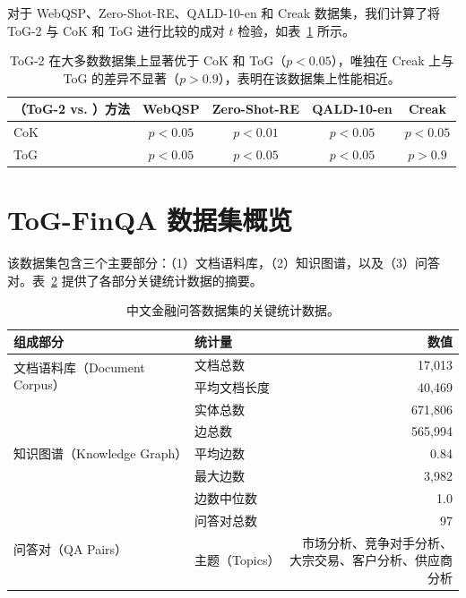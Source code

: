 \documentclass[11pt,UTF8,fontset=fandol]{ctexart}
\newcommand{\toctwo}{ToG-2}
\begin{document}
对于 WebQSP、Zero-Shot-RE、QALD-10-en 和 Creak 数据集，我们计算了将 \toctwo{} 与 CoK 和 ToG 进行比较的成对 $t$ 检验，如表~\ref{tab:12} 所示。

\begin{table}[H]\centering
\caption{\toctwo{} 在大多数数据集上显著优于 CoK 和 ToG（$p<0.05$），唯独在 Creak 上与 ToG 的差异不显著（$p>0.9$），表明在该数据集上性能相近。}
\begin{tabular}{lcccc}
\toprule
（\toctwo{} vs. ）方法 & WebQSP & Zero-Shot-RE & QALD-10-en & Creak\\
\midrule
CoK & $p<0.05$ & $p<0.01$ & $p<0.05$ & $p<0.05$\\
ToG & $p<0.05$ & $p<0.05$ & $p<0.05$ & $p>0.9$\\
\bottomrule
\end{tabular}
\label{tab:12}
\end{table}

\section{ToG-FinQA 数据集概览}

该数据集包含三个主要部分：（1）文档语料库，（2）知识图谱，以及（3）问答对。表~\ref{tab:13} 提供了各部分关键统计数据的摘要。

\begin{table}[H]\centering
\caption{中文金融问答数据集的关键统计数据。}
\setlength{\tabcolsep}{6pt}
\renewcommand{\arraystretch}{1.2}
\small
\begin{tabular}{llr}
\toprule
组成部分 & 统计量 & 数值\\
\midrule
\multirow{2}{*}{文档语料库（Document Corpus）} & 文档总数 & 17,013\\
 & 平均文档长度 & 40,469\\
\midrule
\multirow{5}{*}{知识图谱（Knowledge Graph）} & 实体总数 & 671,806\\
 & 边总数 & 565,994\\
 & 平均边数 & 0.84\\
 & 最大边数 & 3,982\\
 & 边数中位数 & 1.0\\
\midrule
\multirow{2}{*}{问答对（QA Pairs）} & 问答对总数 & 97\\
 & 主题（Topics） & \makecell[l]{市场分析、竞争对手分析、\\大宗交易、客户分析、供应商分析}\\
\bottomrule
\end{tabular}
\label{tab:13}
\end{table}
\end{document}
